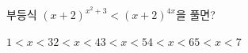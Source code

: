 부등식 $(x+2)^{x^2+3}<(x+2)^{4x}$을 풀면? 
\begin{choices32}{$1<x<3$}{$2<x<4$}{$3<x<5$}{$4<x<6$}{$5<x<7$}\end{choices32}
